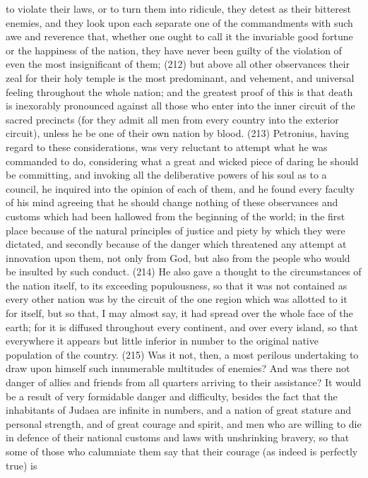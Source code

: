 to violate their laws, or to turn them into ridicule, they detest as their bitterest enemies, and they
look upon each separate one of the commandments with such awe and reverence that, whether
one ought to call it the invariable good fortune or the happiness of the nation, they have never been
guilty of the violation of even the most insignificant of them; (212) but above all other observances
their zeal for their holy temple is the most predominant, and vehement, and universal feeling
throughout the whole nation; and the greatest proof of this is that death is inexorably pronounced
against all those who enter into the inner circuit of the sacred precincts (for they admit all men from
every country into the exterior circuit), unless he be one of their own nation by blood. (213)
Petronius, having regard to these considerations, was very reluctant to attempt what he was
commanded to do, considering what a great and wicked piece of daring he should be committing,
and invoking all the deliberative powers of his soul as to a council, he inquired into the opinion of
each of them, and he found every faculty of his mind agreeing that he should change nothing of
these observances and customs which had been hallowed from the beginning of the world; in the
first place because of the natural principles of justice and piety by which they were dictated, and
secondly because of the danger which threatened any attempt at innovation upon them, not only
from God, but also from the people who would be insulted by such conduct. (214) He also gave a
thought to the circumstances of the nation itself, to its exceeding populousness, so that it was not
contained as every other nation was by the circuit of the one region which was allotted to it for
itself, but so that, I may almost say, it had spread over the whole face of the earth; for it is diffused
throughout every continent, and over every island, so that everywhere it appears but little inferior in
number to the original native population of the country. (215) Was it not, then, a most perilous
undertaking to draw upon himself such innumerable multitudes of enemies? And was there not
danger of allies and friends from all quarters arriving to their assistance? It would be a result of
very formidable danger and difficulty, besides the fact that the inhabitants of Judaea are infinite in
numbers, and a nation of great stature and personal strength, and of great courage and spirit, and
men who are willing to die in defence of their national customs and laws with unshrinking bravery,
so that some of those who calumniate them say that their courage (as indeed is perfectly true) is
